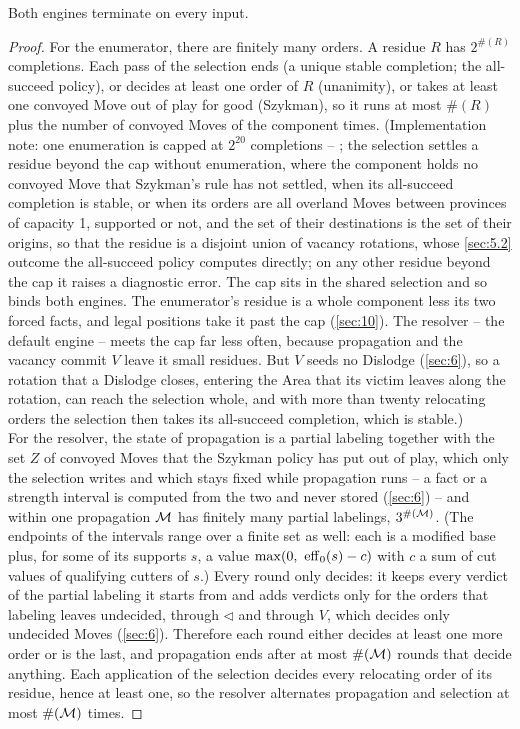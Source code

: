 \documentclass[12pt,a4paper]{article}
\begin{document}
\begin{theorem}[termination]\label{thm:T2}
Both engines terminate on every input.
\end{theorem}
\begin{proof}
For the enumerator, there are finitely many orders.
A residue $R$ has $2^{\#(R)}$ completions.
Each pass of the selection ends (a unique stable completion; the all-succeed policy), or decides at least one order of $R$ (unanimity), or takes at least one convoyed Move out of play for good (Szykman), so it runs at most $\#(R)$ plus the number of convoyed Moves of the component times.
(Implementation note: one enumeration is capped at $2^{20}$ completions -- ; the selection settles a residue beyond the cap without enumeration, where the component holds no convoyed Move that Szykman's rule has not settled, when its all-succeed completion is stable, or when its orders are all overland Moves between provinces of capacity 1, supported or not, and the set of their destinations is the set of their origins, so that the residue is a disjoint union of vacancy rotations, whose \cref{sec:5.2} outcome the all-succeed policy computes directly; on any other residue beyond the cap it raises a diagnostic error.
The cap sits in the shared selection and so binds both engines.
The enumerator's residue is a whole component less its two forced facts, and legal positions take it past the cap (\cref{sec:10}).
The resolver -- the default engine -- meets the cap far less often, because propagation and the vacancy commit $V$ leave it small residues.
But $V$ seeds no Dislodge (\cref{sec:6}), so a rotation that a Dislodge closes, entering the Area that its victim leaves along the rotation, can reach the selection whole, and with more than twenty relocating orders the selection then takes its all-succeed completion, which is stable.)\\
For the resolver, the state of propagation is a partial labeling together with the set $Z$ of convoyed Moves that the Szykman policy has put out of play, which only the selection writes and which stays fixed while propagation runs -- a fact or a strength interval is computed from the two and never stored (\cref{sec:6}) -- and within one propagation $\mathcal{M}$ has finitely many partial labelings, $3^{\#(\mathcal{M})}$.
(The endpoints of the intervals range over a finite set as well: each is a modified base plus, for some of its supports $s$, a value $\max(0,\ \operatorname{eff}_0(s) - c)$ with $c$ a sum of cut values of qualifying cutters of $s$.)
Every round only decides: it keeps every verdict of the partial labeling it starts from and adds verdicts only for the orders that labeling leaves undecided, through $\lhd$ and through $V$, which decides only undecided Moves (\cref{sec:6}).
Therefore each round either decides at least one more order or is the last, and propagation ends after at most $\#(\mathcal{M})$ rounds that decide anything.
Each application of the selection decides every relocating order of its residue, hence at least one, so the resolver alternates propagation and selection at most $\#(\mathcal{M})$ times.
\end{proof}
\end{document}
